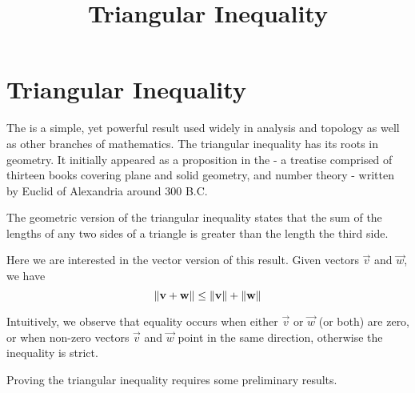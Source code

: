 \documentclass{ximera}
\title{Triangular Inequality} \license{CC BY-NC-SA 4.0}
\begin{document}
\begin{abstract}
 
\end{abstract}
\maketitle

\section*{Triangular Inequality}

The  is a simple, yet powerful result used widely in analysis and topology as well as other branches of mathematics.  The triangular inequality has its roots in geometry. It initially appeared as a proposition in the  - a treatise comprised of thirteen books covering plane and solid geometry, and number theory - written by Euclid of Alexandria around 300 B.C.

The geometric version of the triangular inequality states that the sum of the lengths of any two sides of a triangle is greater than the length the third side.  

Here we are interested in the vector version of this result.  Given vectors $\vec{v}$ and $\vec{w}$, we have
$$\left\lVert\mathbf{v}+\mathbf{w}\right\rVert\leq\left\lVert\mathbf{v}\right\rVert+\left\lVert\mathbf{w}\right\rVert$$

\begin{center}
\end{center}

Intuitively, we observe that equality occurs when either $\vec{v}$ or $\vec{w}$ (or both) are zero, or when non-zero vectors $\vec{v}$ and $\vec{w}$ point in the same direction, otherwise the inequality is strict.

Proving the triangular inequality requires some preliminary results.
\end{document}
